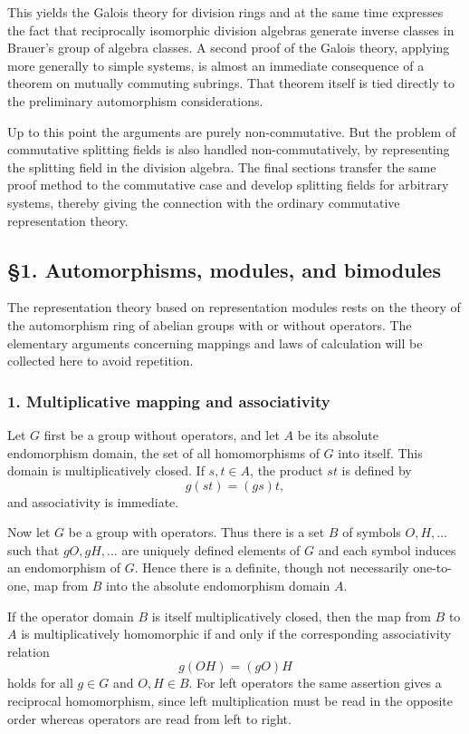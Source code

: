 \documentclass[
  11pt,
]{article}
\begin{document}
This yields the Galois theory for division rings and at the same time
expresses the fact that reciprocally isomorphic division algebras
generate inverse classes in Brauer's group of algebra classes. A second
proof of the Galois theory, applying more generally to simple systems,
is almost an immediate consequence of a theorem on mutually commuting
subrings. That theorem itself is tied directly to the preliminary
automorphism considerations.

Up to this point the arguments are purely non-commutative. But the
problem of commutative splitting fields is also handled
non-commutatively, by representing the splitting field in the division
algebra. The final sections transfer the same proof method to the
commutative case and develop splitting fields for arbitrary systems,
thereby giving the connection with the ordinary commutative
representation theory.

\subsection{§1. Automorphisms, modules, and
bimodules}\label{automorphisms-modules-and-bimodules}

The representation theory based on representation modules rests on the
theory of the automorphism ring of abelian groups with or without
operators. The elementary arguments concerning mappings and laws of
calculation will be collected here to avoid repetition.

\subsubsection{1. Multiplicative mapping and
associativity}\label{multiplicative-mapping-and-associativity}

Let \(G\) first be a group without operators, and let \(A\) be its
absolute endomorphism domain, the set of all homomorphisms of \(G\) into
itself. This domain is multiplicatively closed. If \(s,t\in A\), the
product \(st\) is defined by \[
  g(st)=(gs)t,
\] and associativity is immediate.

Now let \(G\) be a group with operators. Thus there is a set \(B\) of
symbols \(O,H,\ldots\) such that \(gO,gH,\ldots\) are uniquely defined
elements of \(G\) and each symbol induces an endomorphism of \(G\).
Hence there is a definite, though not necessarily one-to-one, map from
\(B\) into the absolute endomorphism domain \(A\).

If the operator domain \(B\) is itself multiplicatively closed, then the
map from \(B\) to \(A\) is multiplicatively homomorphic if and only if
the corresponding associativity relation \[
  g(OH)=(gO)H
\] holds for all \(g\in G\) and \(O,H\in B\). For left operators the
same assertion gives a reciprocal homomorphism, since left
multiplication must be read in the opposite order whereas operators are
read from left to right.
\end{document}
